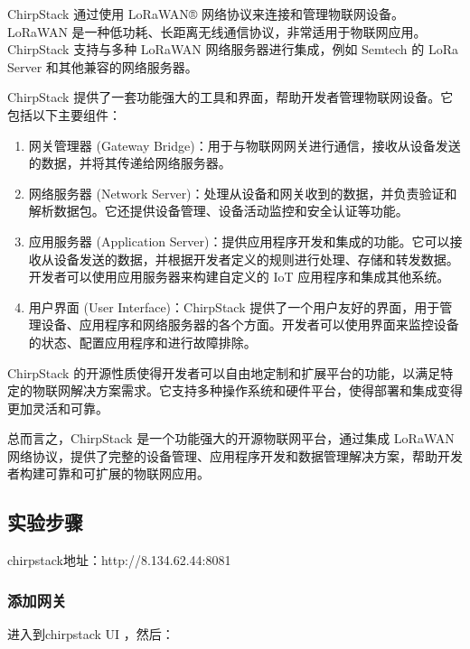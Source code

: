 \documentclass[a4paper,12pt,english]{sphinxmanual}
\begin{document}
{{\sphinxAtStartPar
ChirpStack 通过使用 LoRaWAN® 网络协议来连接和管理物联网设备。LoRaWAN 是一种低功耗、长距离无线通信协议，非常适用于物联网应用。ChirpStack 支持与多种 LoRaWAN 网络服务器进行集成，例如 Semtech 的 LoRa Server 和其他兼容的网络服务器。

\sphinxAtStartPar
ChirpStack 提供了一套功能强大的工具和界面，帮助开发者管理物联网设备。它包括以下主要组件：
\begin{enumerate}
%
\item {} 
\sphinxAtStartPar
网关管理器 (Gateway Bridge)：用于与物联网网关进行通信，接收从设备发送的数据，并将其传递给网络服务器。

\item {} 
\sphinxAtStartPar
网络服务器 (Network Server)：处理从设备和网关收到的数据，并负责验证和解析数据包。它还提供设备管理、设备活动监控和安全认证等功能。

\item {} 
\sphinxAtStartPar
应用服务器 (Application Server)：提供应用程序开发和集成的功能。它可以接收从设备发送的数据，并根据开发者定义的规则进行处理、存储和转发数据。开发者可以使用应用服务器来构建自定义的 IoT 应用程序和集成其他系统。

\item {} 
\sphinxAtStartPar
用户界面 (User Interface)：ChirpStack 提供了一个用户友好的界面，用于管理设备、应用程序和网络服务器的各个方面。开发者可以使用界面来监控设备的状态、配置应用程序和进行故障排除。

\end{enumerate}

\sphinxAtStartPar
ChirpStack 的开源性质使得开发者可以自由地定制和扩展平台的功能，以满足特定的物联网解决方案需求。它支持多种操作系统和硬件平台，使得部署和集成变得更加灵活和可靠。

\sphinxAtStartPar
总而言之，ChirpStack 是一个功能强大的开源物联网平台，通过集成 LoRaWAN 网络协议，提供了完整的设备管理、应用程序开发和数据管理解决方案，帮助开发者构建可靠和可扩展的物联网应用。


\subsection{实验步骤}
\label{\detokenize{exp-lora/lorawan-esp32:id5}}
\sphinxAtStartPar
chirpstack地址：http://8.134.62.44:8081


\subsubsection{添加网关}
\label{\detokenize{exp-lora/lorawan-esp32:id6}}
\sphinxAtStartPar
进入到chirpstack UI ，然后：
\begin{quote}


\end{quote}}}
\end{document}

